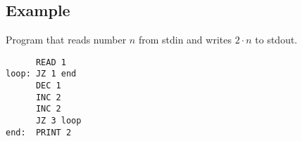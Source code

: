 \documentclass[english,shortabstract,mgr]{iithesis}
\begin{document}
\subsection {Example}
Program that reads number $n$ from stdin and writes $2 \cdot n$ to stdout.

\begin{verbatim}
      READ 1
loop: JZ 1 end
      DEC 1
      INC 2
      INC 2
      JZ 3 loop
end:  PRINT 2
\end{verbatim}


\end{document}
